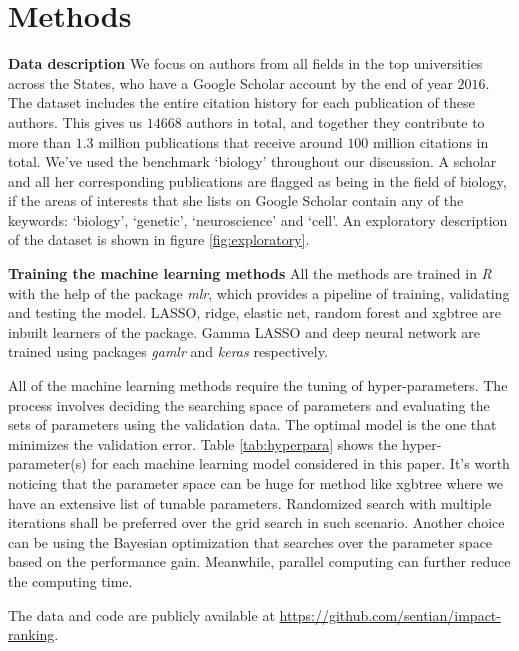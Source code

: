 \section*{Methods}
\noindent\textbf{Data description}
We focus on authors from all fields in the top universities across the States, who have a Google Scholar account by the end of year $2016$. The dataset includes the entire citation history for each publication of these authors. This gives us $14668$ authors in total, and together they contribute to more than $1.3$ million publications that receive around $100$ million citations in total. We've used the benchmark `biology' throughout our discussion. A scholar and all her corresponding publications are flagged as being in the field of biology, if the areas of interests that she lists on Google Scholar contain any of the keywords: `biology', `genetic', `neuroscience' and `cell'. An exploratory description of the dataset is shown in figure \ref{fig:exploratory}. 

\noindent\textbf{Training the machine learning methods}
All the methods are trained in \textit{R}\supercite{RCT2019} with the help of the package \textit{mlr}\supercite{Bischl2016}, which provides a pipeline of training, validating and testing the model. LASSO, ridge, elastic net, random forest and xgbtree are inbuilt learners of the package. Gamma LASSO and deep neural network are trained using packages \textit{gamlr}\supercite{taddy2017one} and \textit{keras}\supercite{Allaire2019} respectively.

All of the machine learning methods require the tuning of hyper-parameters. The process involves deciding the searching space of parameters and evaluating the sets of parameters using the validation data. The optimal model is the one that minimizes the validation error. Table \ref{tab:hyperpara} shows the hyper-parameter(s) for each machine learning model considered in this paper. It's worth noticing that the parameter space can be huge for method like xgbtree where we have an extensive list of tunable parameters. Randomized search with multiple iterations shall be preferred over the grid search in such scenario. Another choice can be using the Bayesian optimization that searches over the parameter space based on the performance gain. Meanwhile, parallel computing can further reduce the computing time.

The data and code are publicly available at \url{https://github.com/sentian/impact-ranking}. 






